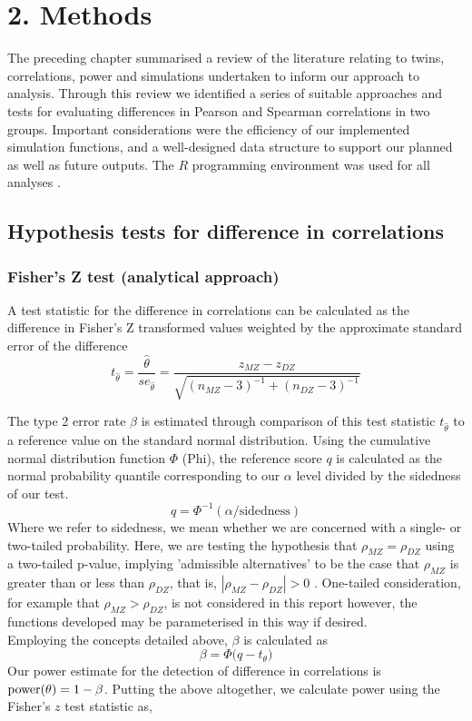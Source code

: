 \chapter*{2. Methods}
\setcounter{chapter}{2}
\setcounter{section}{0}

The preceding chapter summarised a review of the literature relating to twins, correlations, power and simulations undertaken to inform our approach to analysis.  Through this review we identified a series of suitable approaches and tests for evaluating differences in Pearson and Spearman correlations in two groups. Important considerations were the efficiency of our implemented simulation functions, and a well-designed data structure to support our planned as well as future outputs.  The $R$ programming environment was used for all analyses \cite{R2018}.

\section{Hypothesis tests for difference in correlations}
\subsection{Fisher's Z test (analytical approach)}
A test statistic for the difference in correlations can be calculated as the difference in Fisher's Z transformed values weighted by the approximate standard error of the difference \cite{Fisher1990,David1938}
$$t_{\hat{\theta}} = {\frac{\hat{\theta}}{se_\hat{\theta}}} = {\frac{z_{MZ} - z_{DZ}}{\sqrt{(n_{MZ}-3)^{-1}+(n_{DZ}-3)^{-1}}}} $$

The type 2 error rate $\beta$ is estimated through comparison of this test statistic $t_{\hat{\theta}}$ to a reference value on the standard normal distribution.   Using the cumulative normal distribution function $\Phi$ (Phi), the reference score $q$ is calculated as the normal probability quantile corresponding to our $\alpha$ level divided by the sidedness of our test. 
 $$q = \Phi^{-1}(\alpha/\text{sidedness})$$
Where we refer to sidedness, we mean whether we are concerned with a single- or two-tailed probability.  Here, we are testing the hypothesis that $\rho_{MZ} = \rho_{DZ}$ using a two-tailed p-value, implying 'admissible alternatives' to be the case that $\rho_{MZ}$ is greater than or less than $\rho_{DZ}$, that is, $|\rho_{MZ} - \rho_{DZ}| > 0$ \cite{David1938}.  One-tailed consideration, for example that $\rho_{MZ} > \rho_{DZ}$, is not considered in this report however, the functions developed may be parameterised in this way if desired. 
\\
Employing the concepts detailed above, $\beta$ is calculated as 
$$\beta = \Phi \big( q - t_\theta \big)$$
Our power estimate for the detection of difference in correlations is $\operatorname{power}(\theta) = 1 - \beta$. Putting the above altogether, we calculate power using the Fisher's $z$ test statistic as,

